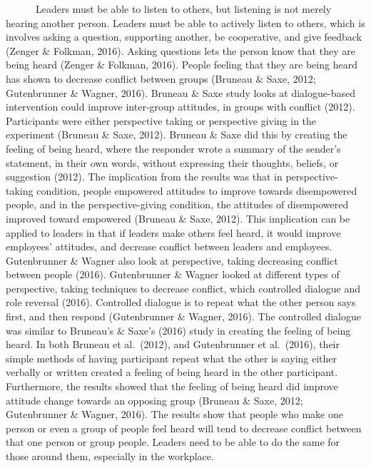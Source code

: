 \documentclass[
  12pt,
]{article}
\begin{document}
~~~~~~Leaders must be able to listen to others, but listening is not merely hearing another person. Leaders must be able to actively listen to others, which is involves asking a question, supporting another, be cooperative, and give feedback (Zenger \& Folkman, 2016). Asking questions lets the person know that they are being heard (Zenger \& Folkman, 2016). People feeling that they are being heard has shown to decrease conflict between groups (Bruneau \& Saxe, 2012; Gutenbrunner \& Wagner, 2016). Bruneau \& Saxe study looks at dialogue-based intervention could improve inter-group attitudes, in groups with conflict (2012). Participants were either perspective taking or perspective giving in the experiment (Bruneau \& Saxe, 2012). Bruneau \& Saxe did this by creating the feeling of being heard, where the responder wrote a summary of the sender's statement, in their own words, without expressing their thoughts, beliefs, or suggestion (2012). The implication from the results was that in perspective-taking condition, people empowered attitudes to improve towards disempowered people, and in the perspective-giving condition, the attitudes of disempowered improved toward empowered (Bruneau \& Saxe, 2012). This implication can be applied to leaders in that if leaders make others feel heard, it would improve employees' attitudes, and decrease conflict between leaders and employees. Gutenbrunner \& Wagner also look at perspective, taking decreasing conflict between people (2016). Gutenbrunner \& Wagner looked at different types of perspective, taking techniques to decrease conflict, which controlled dialogue and role reversal (2016). Controlled dialogue is to repeat what the other person says first, and then respond (Gutenbrunner \& Wagner, 2016). The controlled dialogue was similar to Bruneau's \& Saxe's (2016) study in creating the feeling of being heard. In both Bruneau et al.~(2012), and Gutenbrunner et al.~(2016), their simple methods of having participant repeat what the other is saying either verbally or written created a feeling of being heard in the other participant. Furthermore, the results showed that the feeling of being heard did improve attitude change towards an opposing group (Bruneau \& Saxe, 2012; Gutenbrunner \& Wagner, 2016). The results show that people who make one person or even a group of people feel heard will tend to decrease conflict between that one person or group people. Leaders need to be able to do the same for those around them, especially in the workplace.
\end{document}
